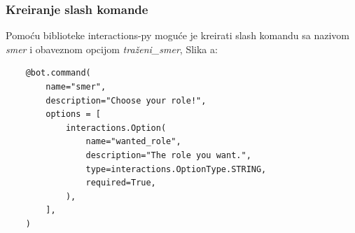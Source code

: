 \documentclass[a4paper,11pt]{article}
\begin{document}
\subsubsection{Kreiranje slash komande}
Pomoću biblioteke interactions-py moguće je kreirati slash komandu sa nazivom \textit{smer} i obaveznom opcijom \textit{traženi\_smer}, Slika a:
\begin{verbatim}
    @bot.command(
        name="smer",
        description="Choose your role!",
        options = [
            interactions.Option(
                name="wanted_role",
                description="The role you want.",
                type=interactions.OptionType.STRING,
                required=True,
            ),
        ],
    )
\end{verbatim}
\begin{figure}[h]
    \centering
\end{figure}
\newpage
\end{document}
